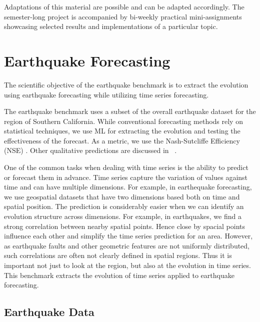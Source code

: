 \documentclass[utf8]{FrontiersinVancouver} %
\begin{document}
Adaptations of this material are possible and can be adapted
accordingly. The semester-long project is accompanied by bi-weekly
practical mini-assignments showcasing selected results and
implementations of a particular topic.

\section{Earthquake Forecasting}
\label{sec:eq}

The scientific objective of the earthquake benchmark is to extract the
evolution using earthquake forecasting while utilizing time series forecasting.

The earthquake benchmark uses a subset of the overall earthquake
dataset for the region of Southern California. While conventional
forecasting methods rely on statistical techniques, we use ML
for extracting the evolution and testing the effectiveness of the
forecast.  As a metric, we use the Nash-Sutcliffe Efficiency (NSE)
\citep{nash-79}.  Other qualitative predictions are discussed in
~\citep{fox2022-jm}.

One of the common tasks when dealing with time series is the ability
to predict or forecast them in advance.  Time series capture the
variation of values against time and can have multiple dimensions. For
example, in earthequake forecasting, we use geospatial datasets that have
two dimensions based both on time and spatial position. The prediction
is considerably easier when we can identify an evolution structure
across dimensions. For example, in earthquakes, we find a strong
correlation between nearby spatial points. Hence close by spacial
points influence each other and simplify the time series prediction
for an area.  However, as earthquake faults and other geometric features
are not uniformly distributed, such correlations are often not clearly
defined in spatial regions. Thus it is important not just to look at
the region, but also at the evolution in time series. This benchmark
extracts the evolution of time series applied to earthquake forecasting.


\subsection{Earthquake Data}
\end{document}
